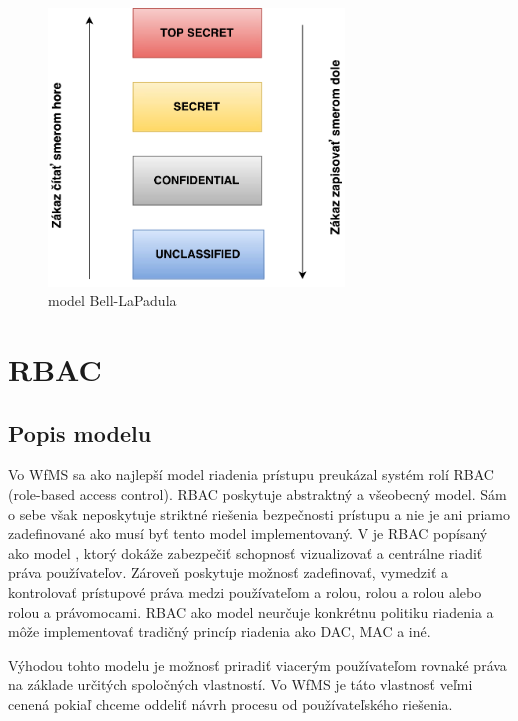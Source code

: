 \begin{figure}[h]
	\centerline{\includegraphics[width=0.7\textwidth]{images/belapadula}}
	\caption{model Bell-LaPadula}
	\label{obr:belapadula}
\end{figure}







\section{RBAC}
\subsection{Popis modelu}
Vo WfMS sa ako najlepší model riadenia prístupu preukázal systém rolí RBAC (role-based access control). RBAC poskytuje abstraktný a všeobecný model. Sám o sebe však neposkytuje striktné riešenia bezpečnosti prístupu a nie je ani priamo zadefinované ako musí byť tento model implementovaný. V \cite{ekonomika} je RBAC popísaný ako model , ktorý dokáže zabezpečiť schopnosť vizualizovať a centrálne riadiť práva používateľov. Zároveň poskytuje možnosť zadefinovať, vymedziť a kontrolovať prístupové práva medzi používateľom a rolou, rolou a rolou alebo rolou a právomocami. RBAC ako model neurčuje konkrétnu politiku riadenia a môže implementovať tradičný princíp riadenia ako DAC, MAC a iné. 

Výhodou tohto modelu je možnosť priradiť viacerým používateľom rovnaké práva na základe určitých spoločných vlastností. Vo WfMS je táto vlastnosť veľmi cenená pokiaľ chceme oddeliť návrh procesu od používateľského riešenia. 


